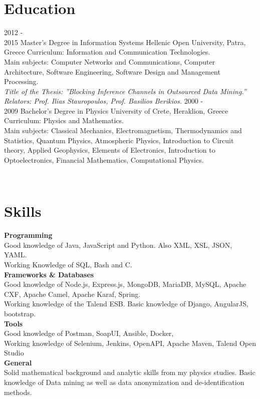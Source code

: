 \documentclass[]{friggeri-cv}
\begin{document}
\section{Education}
\begin{entrylist}
  \entry
    {2012 - \\2015}
    {Master's Degree in Information Systems}
    {Hellenic Open University, Patra, Greece}
    {Curriculum: Information and Communication Technologies.\\
    Main subjects: Computer Networks and Communications, Computer Architecture, Software Engineering, Software Design and Management Processing.\\
    \emph{Title of the Thesis: ”Blocking Inference Channels in Outsourced Data Mining.”}\\
    \emph{Relators: Prof. Ilias Stauropoulos, Prof. Basilios Berikios.}}
  \entry
    {2000 - \\2009}
    {Bachelor's Degree in Physics}
    {University of Crete, Heraklion, Greece}
    {Curriculum: Physics and Mathematics.\\ 
    Main subjects: Classical Mechanics, Electromagnetism, Thermodynamics and Statistics, Quantum Physics, Atmospheric Physics, Introduction to Circuit theory, Applied Geophysics, Elements of Electronics, Introduction to Optoelectronics, Financial Mathematics, Computational Physics.}
\end{entrylist}
~
\section{Skills}
\textbf{Programming}\\
Good knowledge of Java, JavaScript and Python. Also XML, XSL, JSON, YAML.  \\Working Knowledge of SQL, Bash and C.\\
\textbf{Frameworks \& Databases}\\
Good knowledge of Node.js, Express.js, MongoDB, MariaDB, MySQL, Apache CXF, Apache Camel, Apache Karaf, Spring. \\Working knowledge of the Talend ESB. Basic knowledge of Django, AngularJS, bootstrap.\\
\textbf{Tools}\\
Good knowledge of Postman, SoapUI, Ansible, Docker,\\
Working knowledge of Selenium, Jenkins, OpenAPI, Apache Maven, Talend Open Studio \\
\textbf{General}\\ 
Solid mathematical background and analytic skills from my physics studies. Basic knowledge of Data mining as well as data anonymization and de-identification methods.
\\
\end{document}

